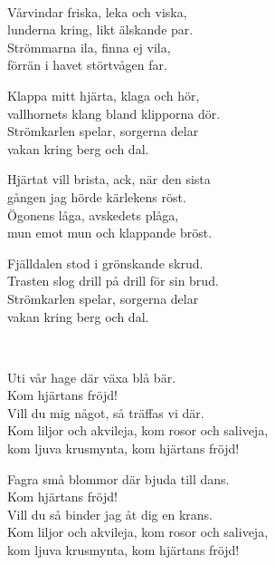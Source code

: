 
\newpage


 \\
\author{Text: Julia Kristina Nyberg alias Euphrosyne}

\songtext{} Vårvindar friska, leka och viska,\\
lunderna kring, likt älskande par.\\
Strömmarna ila, finna ej vila,\\
förrän i havet störtvågen far.

Klappa mitt hjärta, klaga och hör,\\
vallhornets klang bland klipporna dör.\\
Strömkarlen spelar, sorgerna delar\\
vakan kring berg och dal.

Hjärtat vill brista, ack, när den sista\\
gången jag hörde kärlekens röst.\\
Ögonens låga, avskedets plåga,\\
mun emot mun och klappande bröst.

Fjälldalen stod i grönskande skrud.\\
Trasten slog drill på drill för sin brud.\\
Strömkarlen spelar, sorgerna delar\\
vakan kring berg och dal.




 \\

\songtext{} Uti vår hage där växa blå bär.\\
Kom hjärtans fröjd!\\
Vill du mig något, så träffas vi där.\\
Kom liljor och akvileja, kom rosor och saliveja,\\
kom ljuva krusmynta, kom hjärtans fröjd!

Fagra små blommor där bjuda till dans.\\
Kom hjärtans fröjd!\\
Vill du så binder jag åt dig en krans.\\
Kom liljor och akvileja, kom rosor och saliveja,\\
kom ljuva krusmynta, kom hjärtans fröjd!

